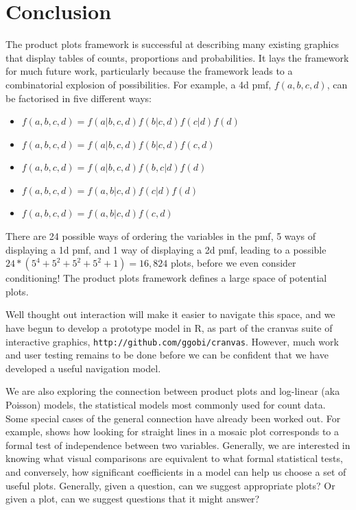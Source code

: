\documentclass[journal]{vgtc}
\begin{document}
\section{Conclusion}
\label{sec:conclusion}

The product plots framework is successful at describing many existing graphics that display tables of counts, proportions and probabilities. It lays the framework for much future work, particularly because the framework leads to a combinatorial explosion of possibilities. For example, a 4d {\sc pmf}, $f(a, b, c, d)$, can be factorised in five different ways:

\begin{itemize}
  \setlength{\itemsep}{0em}
  
  \item $f(a, b, c, d) = f(a | b, c, d) f(b | c, d) f(c | d) f(d)$
  \item $f(a, b, c, d) = f(a | b, c, d) f(b | c, d) f(c, d)$
  \item $f(a, b, c, d) = f(a | b, c, d) f(b, c | d) f(d)$
  \item $f(a, b, c, d) = f(a, b | c, d) f(c | d) f(d)$
  \item $f(a, b, c, d) = f(a, b | c, d) f(c, d)$
\end{itemize}

\noindent There are 24 possible ways of ordering the variables in the {\sc pmf}, 5 ways of displaying a 1d {\sc pmf}, and 1 way of displaying a 2d {\sc pmf}, leading to a possible $24 * (5^4 + 5^2 + 5^2 + 5^2 + 1) = 16,824$ plots, before we even consider conditioning! The product plots framework defines a large space of potential plots.

Well thought out interaction will make it easier to navigate this space, and we have begun to develop a prototype model in R, as part of the cranvas suite of interactive graphics, {\tt http://github.com/ggobi/cranvas}.  However, much work and user testing remains to be done before we can be confident that we have developed a useful navigation model.

We are also exploring the connection between product plots and log-linear (aka Poisson) models, the statistical models most commonly used for count data. Some special cases of the general connection have already been worked out. For example, \citep{hofmann:2003} shows how looking for straight lines in a mosaic plot corresponds to a formal test of independence between two variables. Generally, we are interested in knowing what visual comparisons are equivalent to what formal statistical tests, and conversely, how significant coefficients in a model can help us choose a set of useful plots. Generally, given a question, can we suggest appropriate plots? Or given a plot, can we suggest questions that it might answer?
\end{document}
